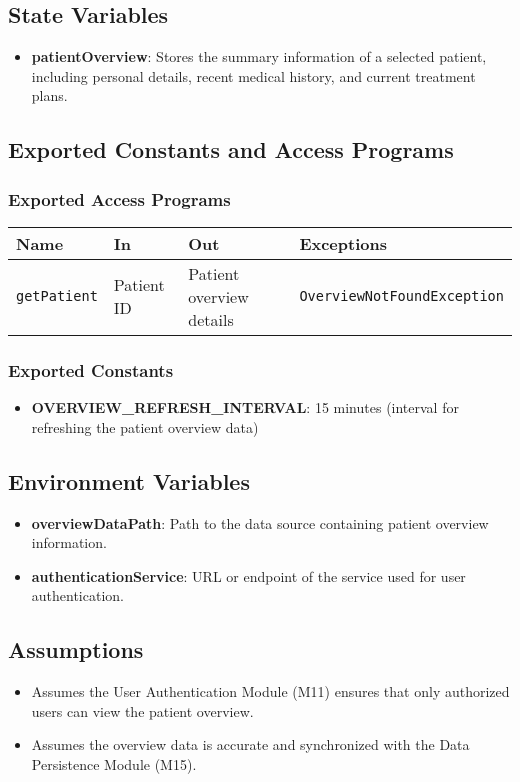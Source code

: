 \documentclass[12pt, titlepage]{article}
\begin{document}
\subsection{State Variables}
\begin{itemize}
\item \textbf{patientOverview}: Stores the summary information of a selected patient, including personal details, recent medical history, and current treatment plans.
\end{itemize}

\subsection{Exported Constants and Access Programs}
\subsubsection{Exported Access Programs}
\begin{tabular}{|l|l|l|l|}
    \hline
    \textbf{Name} & \textbf{In} & \textbf{Out} & \textbf{Exceptions} \\
    \hline 
    \texttt{getPatient} & Patient ID & Patient overview details & \texttt{OverviewNotFoundException} \\
    \hline
\end{tabular}

\subsubsection{Exported Constants}
\begin{itemize}
\item \textbf{OVERVIEW\_REFRESH\_INTERVAL}: 15 minutes (interval for refreshing the patient overview data)
\end{itemize}

\subsection{Environment Variables}
\begin{itemize}
\item \textbf{overviewDataPath}: Path to the data source containing patient overview information.
\item \textbf{authenticationService}: URL or endpoint of the service used for user authentication.
\end{itemize}

\subsection{Assumptions}
\begin{itemize}
\item Assumes the User Authentication Module (M11) ensures that only authorized users can view the patient overview.
\item Assumes the overview data is accurate and synchronized with the Data Persistence Module (M15).
\end{itemize}
\end{document}
